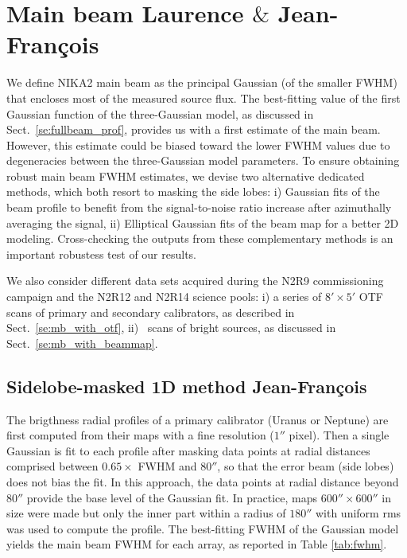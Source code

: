 \section{Main beam {\color{YellowGreen} Laurence $\&$ Jean-Fran\c cois}}
\label{se:MB}


We define NIKA2 main beam as the principal Gaussian (of the smaller FWHM)
that encloses most of the measured source flux. The best-fitting value
of the first Gaussian function of the
three-Gaussian model, as discussed in Sect.~\ref{se:fullbeam_prof},
provides us with a first estimate of the main beam. %
However, this estimate could be biased toward the lower FWHM values due to
degeneracies between the three-Gaussian model parameters. To ensure
obtaining robust main beam FWHM estimates, we devise %
two alternative dedicated
methods, which both resort to masking the side lobes: i) Gaussian fits
of the beam profile to benefit from the signal-to-noise ratio increase
after azimuthally averaging the signal, ii) Elliptical Gaussian fits
of the beam map for a better 2D modeling.
Cross-checking the outputs from these complementary methods is an
important robustess test of our results.

We also consider different data sets acquired during the N2R9
commissioning campaign and the N2R12 and N2R14 science pools: i) a
series of $8' \times 5'$ OTF scans of primary and secondary
calibrators, as described in Sect.~\ref{se:mb_with_otf}, ii)
\bm\ scans of bright sources, as discussed in
Sect.~\ref{se:mb_with_beammap}.



\subsection{Sidelobe-masked 1D method {\color{YellowGreen} Jean-Fran\c cois}}
\label{se:beam_mb_1D} 

The brigthness radial profiles of a primary calibrator (Uranus or
Neptune) are first computed from their maps with a fine resolution
($1''$ pixel). Then a single Gaussian is fit to each profile after
masking data points at radial distances comprised between
$0.65 \times$ FWHM and $80''$, so that the error beam (side lobes)
does not bias the fit. In this approach, the data points at radial
distance beyond $80''$ provide the base level of the Gaussian fit. In
practice, maps $600'' \times 600''$ in size were made but only the
inner part within a radius of $180''$ with uniform rms was used to
compute the profile.
The best-fitting FWHM of the Gaussian model
yields the main beam FWHM for each array, as reported in Table
\ref{tab:fwhm}.

